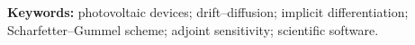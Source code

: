 \documentclass[11pt,a4paper]{article}
\title{\papertitle}
\author{\paperauthors}
\date{}
\begin{document}
\maketitle
\paperaffiliations

\noindent\textbf{Keywords:} photovoltaic devices; drift--diffusion;
implicit differentiation; Scharfetter--Gummel scheme; adjoint sensitivity;
scientific software.



\end{document}
